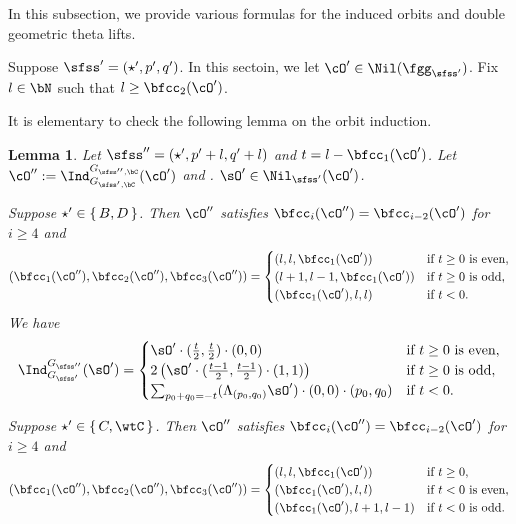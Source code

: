 \documentclass[12pt,a4paper]{amsart}
\def\abs#1{\left|{#1}\right|}
\numberwithin{equation}{section}
\newtheorem{lem}[thm]{Lemma}
\theoremstyle{remark}
\def\cOp{\cO^{\prime}}
\def\cOpp{\cO^{\prime\prime}}
\begin{document}
\def\indsss{\Ind_{G_{\sfss'}}^{G_{\sfss''}}}
\def\indss{\Ind_{G_{\sfss',\bC}}^{G_{\sfss'',\bC}}}

In this subsection, we provide various formulas for the induced orbits and double
geometric theta lifts. 

Suppose $\sfss' = (\star',p',q')$. In this sectoin, we let $\cOp\in\Nil(\fggsp)$.
Fix $l\in \bN$ such that $l\geq \bfcc_2(\cOp)$. 

It is elementary to check the following lemma on the orbit induction. 
\begin{lem}\label{lem:ind}
Let $\sfss'' =(\star',p'+l,q'+l)$ and $t = l-\bfcc_1(\cOp)$.
Let $\cOpp:=\indss(\cOp)$ and . %
    $\sOp\in \Nil_{\sfss'}(\cOp)$.
  \begin{enuma}
    \item Suppose $\star'\in \set{B,D}$.
    Then $\cOpp$ satisfies 
    $\bfcc_i(\cOpp)=\bfcc_{i-2}(\cOp)$ for $i\geq 4$ and
    \[
      (\bfcc_1(\cOpp), \bfcc_2(\cOpp),\bfcc_3(\cOpp))
      =\begin{cases}
        (l,l,\bfcc_1(\cOp))     & \text{if $t\geq 0$ is even}, \\
          (l+1,l-1,\bfcc_1(\cOp)) & \text{if $t\geq 0$ is odd},  \\
          (\bfcc_1(\cOp),l,l)     & \text{if $t<0$}.             \\
      \end{cases}
    \]
    We have
    \[
      \indsss(\sOp) =
      \begin{cases}
        \sOp\cdot (\frac{t}{2},\frac{t}{2})\cdot (0,0)
         & \text{if $t \geq 0$ is even}, \\
        2  \left(\sOp\cdot (\frac{t-1}{2},\frac{t-1}{2})\cdot (1,1) \right)
         & \text{if $t\geq 0$ is odd},   \\
        \sum_{p_0+q_0=-t}
        (\Lambda_{(p_0,q_0)}\sOp)\cdot (0,0)\cdot (p_0,q_0)
         & \text{if $t<0$}.              \\
      \end{cases}
    \]
    \item Suppose $\star'\in \set{C,\wtC}$.
    Then $\cOpp$ satisfies
    $\bfcc_i(\cOpp)=\bfcc_{i-2}(\cOp)$ for $i\geq 4$ and
    \[
      (\bfcc_1(\cOpp), \bfcc_2(\cOpp),\bfcc_3(\cOpp))
      =\begin{cases}
        (l,l,\bfcc_1(\cOp))     & \text{if $t\geq 0$}, \\
        (\bfcc_1(\cOp),l,l) & \text{if $t < 0$ is even},  \\
        (\bfcc_1(\cOp),l+1,l-1)     & \text{if $t<0$ is odd}.             \\
      \end{cases}
    \]


\end{enuma}
\end{lem}
\end{document}
